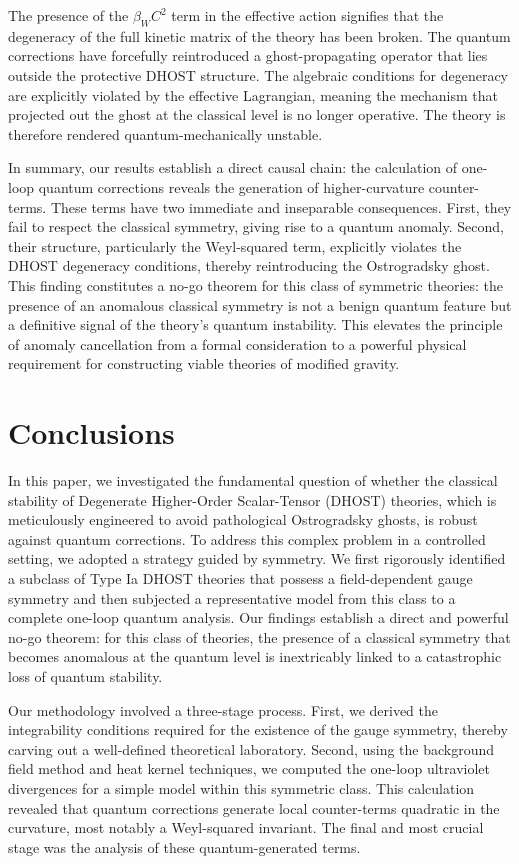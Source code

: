 \documentclass[twocolumn]{aastex631}
\begin{document}
The presence of the $\beta_W C^2$ term in the effective action signifies that the degeneracy of the full kinetic matrix of the theory has been broken. The quantum corrections have forcefully reintroduced a ghost-propagating operator that lies outside the protective DHOST structure. The algebraic conditions for degeneracy are explicitly violated by the effective Lagrangian, meaning the mechanism that projected out the ghost at the classical level is no longer operative. The theory is therefore rendered quantum-mechanically unstable.

In summary, our results establish a direct causal chain: the calculation of one-loop quantum corrections reveals the generation of higher-curvature counter-terms. These terms have two immediate and inseparable consequences. First, they fail to respect the classical symmetry, giving rise to a quantum anomaly. Second, their structure, particularly the Weyl-squared term, explicitly violates the DHOST degeneracy conditions, thereby reintroducing the Ostrogradsky ghost. This finding constitutes a no-go theorem for this class of symmetric theories: the presence of an anomalous classical symmetry is not a benign quantum feature but a definitive signal of the theory's quantum instability. This elevates the principle of anomaly cancellation from a formal consideration to a powerful physical requirement for constructing viable theories of modified gravity.

\section{Conclusions}
\label{sec:conclusions}
In this paper, we investigated the fundamental question of whether the classical stability of Degenerate Higher-Order Scalar-Tensor (DHOST) theories, which is meticulously engineered to avoid pathological Ostrogradsky ghosts, is robust against quantum corrections. To address this complex problem in a controlled setting, we adopted a strategy guided by symmetry. We first rigorously identified a subclass of Type Ia DHOST theories that possess a field-dependent gauge symmetry and then subjected a representative model from this class to a complete one-loop quantum analysis. Our findings establish a direct and powerful no-go theorem: for this class of theories, the presence of a classical symmetry that becomes anomalous at the quantum level is inextricably linked to a catastrophic loss of quantum stability.

Our methodology involved a three-stage process. First, we derived the integrability conditions required for the existence of the gauge symmetry, thereby carving out a well-defined theoretical laboratory. Second, using the background field method and heat kernel techniques, we computed the one-loop ultraviolet divergences for a simple model within this symmetric class. This calculation revealed that quantum corrections generate local counter-terms quadratic in the curvature, most notably a Weyl-squared invariant. The final and most crucial stage was the analysis of these quantum-generated terms.
\end{document}
